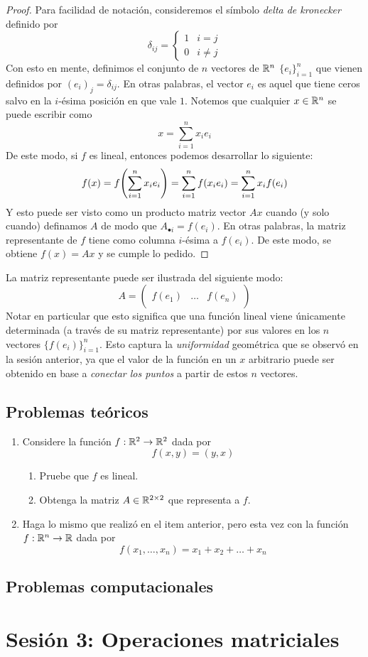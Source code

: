 \begin{proof}
    Para facilidad de notación, consideremos el símbolo \textit{delta de kronecker} definido por
    \[\delta_{ij} = \begin{cases}
        1 & i = j \\
        0 & i \neq j
    \end{cases}\]
    Con esto en mente, definimos el conjunto de $n$ vectores de $\mathbb{R}^n$ $\{e_i\}_{i=1}^n$ que vienen definidos por $(e_i)_j = \delta_{ij}$. En otras palabras, el vector $e_i$ es aquel que tiene ceros salvo en la $i$-ésima posición en que vale $1$. Notemos que cualquier $x \in \mathbb{R}^n$ se puede escribir como
    \[x = \sum_{i=1}^n x_i e_i\]
    De este modo, si $f$ es lineal, entonces podemos desarrollar lo siguiente:
    \[f(x) = f\qty(\sum_{i=1}^n x_i e_i) = \sum_{i=1}^n f(x_i e_i) = \sum_{i=1}^n x_i f(e_i)\]
    Y esto puede ser visto como un producto matriz vector $Ax$ cuando (y solo cuando) definamos $A$ de modo que $A_{\bullet i} = f(e_i)$. En otras palabras, la matriz representante de $f$ tiene como columna $i$-ésima a $f(e_i)$. De este modo, se obtiene $f(x) = Ax$ y se cumple lo pedido.
\end{proof}

\begin{remark}
    La matriz representante puede ser ilustrada del siguiente modo:
    \[A = \begin{pmatrix} & & \\ f(e_1) & \dots & f(e_n) \\ & & \end{pmatrix}\]
    Notar en particular que esto significa que una función lineal viene únicamente determinada (a través de su matriz representante) por sus valores en los $n$ vectores $\{f(e_i)\}_{i=1}^n$. Esto captura la \textit{uniformidad} geométrica que se observó en la sesión anterior, ya que el valor de la función en un $x$ arbitrario puede ser obtenido en base a \textit{conectar los puntos} a partir de estos $n$ vectores.
\end{remark}

\subsection{Problemas teóricos}

\begin{enumerate}
    \item Considere la función $f: \mathbb{R}^2 \to \mathbb{R}^2$ dada por
    \[f(x, y) = (y, x)\]
    \begin{enumerate}
        \item Pruebe que $f$ es lineal.
        \item Obtenga la matriz $A \in \mathbb{R}^{2 \times 2}$ que representa a $f$.
    \end{enumerate}
    \item Haga lo mismo que realizó en el item anterior, pero esta vez con la función $f: \mathbb{R}^n \to \mathbb{R}$ dada por
    \[f(x_1, \dots , x_n) = x_1 + x_2 + \dots + x_n\]
\end{enumerate}

\subsection{Problemas computacionales}

\section{Sesión 3: Operaciones matriciales}

